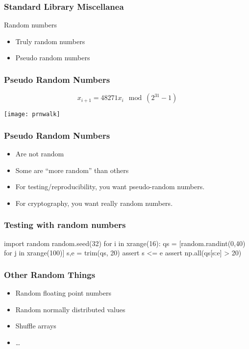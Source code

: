 \begin{frame}[fragile]
\frametitle{Standard Library Miscellanea}
Random numbers
\begin{itemize}
\item Truly random numbers
\item Pseudo random numbers
\end{itemize}
\end{frame}

\begin{frame}[fragile]
\frametitle{Pseudo Random Numbers}

\[
x_{i+1} = 48271 x_i \mod (2^{31}-1)
\]

\centering
\texttt{[image: prnwalk]}

\end{frame}

\begin{frame}[fragile]
\frametitle{Pseudo Random Numbers}
\begin{itemize}
\item Are not random
\item Some are ``more random'' than others
\end{itemize}
\pause

\begin{itemize}
\item For testing/reproducibility, you want \alert{pseudo-}random numbers.
\item For cryptography, you want really random numbers.
\end{itemize}
\end{frame}

\begin{frame}[fragile]
\frametitle{Testing with random numbers}

\begin{python}
import random
random.seed(32)
for i in xrange(16):
    qs = [random.randint(0,40) for j in xrange(100)]
    s,e = trim(qs, 20)
    assert s <= e
    assert np.all(qs[s:e] > 20)
\end{python}
\end{frame}

\begin{frame}[fragile]
\frametitle{Other Random Things}
\begin{itemize}
\item Random floating point numbers
\item Random normally distributed values
\item Shuffle arrays
\item \ldots
\end{itemize}
\end{frame}

